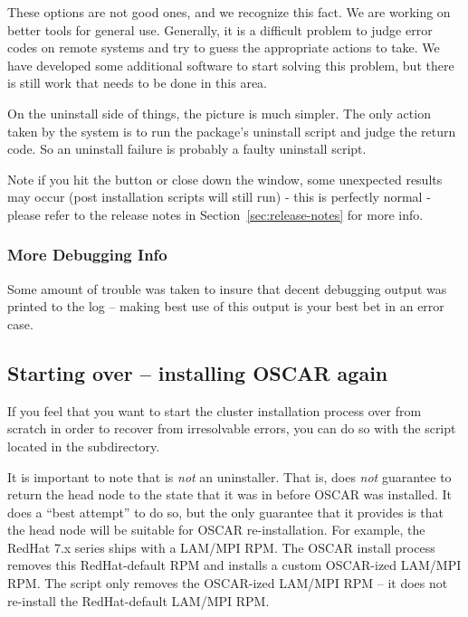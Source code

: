 These options are not good ones, and we recognize this fact.  We are working
on better tools for general use.  Generally, it is a difficult problem to
judge error codes on remote systems and try to guess the appropriate actions
to take.  We have developed some additional software to start solving this
problem, but there is still work that needs to be done in this area.

On the uninstall side of things, the picture is much simpler.  The only
action taken by the system is to run the package's uninstall script and
judge the return code.  So an uninstall failure is probably a faulty
uninstall script.

Note if you hit the  button or close down the window,
some unexpected results may
occur (post installation scripts will still run) - this is
perfectly normal - please refer to the release notes in
Section~\ref{sec:release-notes} for more info.


\subsubsection{More Debugging Info}
\label{det:more-debug-info}

Some amount of trouble was taken to insure that decent debugging output
was printed to the log -- making best use of this output is your best bet
in an error case.


\subsection{Starting over -- installing OSCAR again}

If you feel that you want to start the cluster installation process
over from scratch in order to recover from irresolvable errors, you
can do so with the  script located in the
 subdirectory.

It is important to note that  is {\em not} an
uninstaller.  That is,  does {\em not} guarantee to
return the head node to the state that it was in before OSCAR was
installed.  It does a ``best attempt'' to do so, but the only
guarantee that it provides is that the head node will be suitable for
OSCAR re-installation.  For example, the RedHat 7.x series ships with
a LAM/MPI RPM.  The OSCAR install process removes this RedHat-default
RPM and installs a custom OSCAR-ized LAM/MPI RPM.  The
 script only removes the OSCAR-ized LAM/MPI RPM -- it
does not re-install the RedHat-default LAM/MPI RPM.

